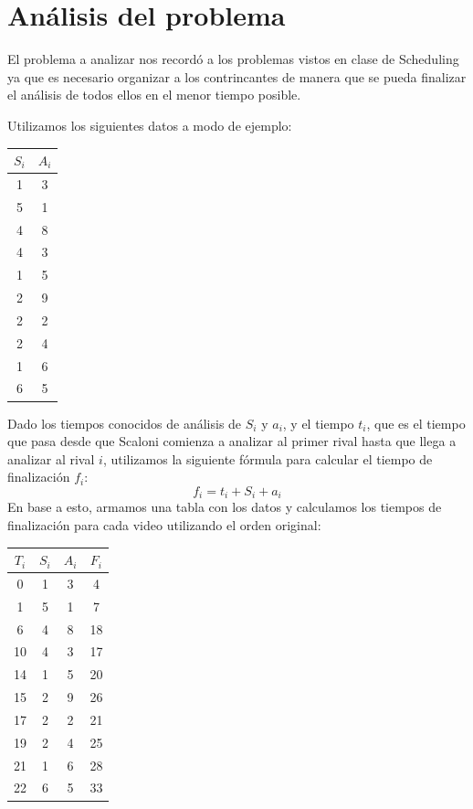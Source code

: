 \documentclass{estilo}
\begin{document}
\maketitle

\justifying{}

% 
\newpage

\section{Análisis del problema}

El problema a analizar nos recordó a los problemas vistos en clase de Scheduling ya que es necesario organizar a los contrincantes de manera que se pueda finalizar el análisis de todos ellos en el menor tiempo posible.

Utilizamos los siguientes datos a modo de ejemplo:

\begin{center}
\begin{tabular}{|c|c|}
\hline
$S_i$ & $A_i$ \\
\hline
1 & 3 \\
5 & 1 \\
4 & 8 \\
4 & 3 \\
1 & 5 \\
2 & 9 \\
2 & 2 \\
2 & 4 \\
1 & 6 \\
6 & 5 \\
\hline
\end{tabular}
\end{center}

Dado los tiempos conocidos de análisis de $S_i$ y $a_i$, y el tiempo $t_i$, que es el tiempo que pasa desde que Scaloni comienza a analizar al primer rival hasta que llega a analizar al rival $i$, utilizamos la siguiente fórmula para calcular el tiempo de finalización $f_i$:
\[
f_i = t_i + S_i + a_i
\]
En base a esto, armamos una tabla con los datos y calculamos los tiempos de finalización para cada video utilizando el orden original:

\begin{center}
\begin{tabular}{|c|c|c|c|}
\hline
$T_i$ & $S_i$ & $A_i$ & $F_i$ \\
\hline
0 & 1 & 3 & 4 \\
1 & 5 & 1 & 7 \\
6 & 4 & 8 & 18 \\
10 & 4 & 3 & 17 \\
14 & 1 & 5 & 20 \\
15 & 2 & 9 & 26 \\
17 & 2 & 2 & 21 \\
19 & 2 & 4 & 25 \\
21 & 1 & 6 & 28 \\
22 & 6 & 5 & 33 \\
\hline
\end{tabular}
\end{center}
\end{document}
